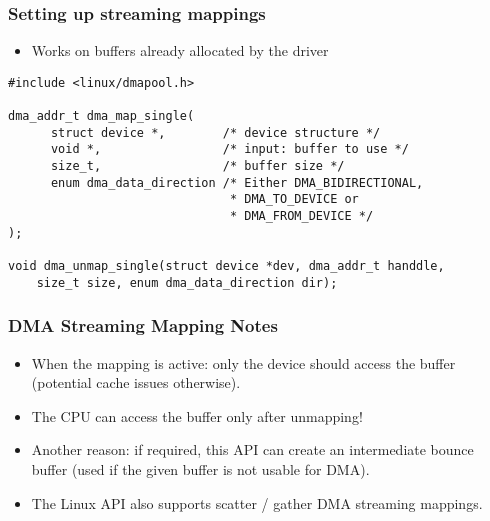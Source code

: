 \begin{frame}[fragile]
  \frametitle{Setting up streaming mappings}
  \begin{itemize}
  \item Works on buffers already allocated by the driver
  \end{itemize}
\begin{verbatim}
#include <linux/dmapool.h>

dma_addr_t dma_map_single(
      struct device *,        /* device structure */
      void *,                 /* input: buffer to use */
      size_t,                 /* buffer size */
      enum dma_data_direction /* Either DMA_BIDIRECTIONAL,
                               * DMA_TO_DEVICE or
                               * DMA_FROM_DEVICE */
);

void dma_unmap_single(struct device *dev, dma_addr_t handdle,
    size_t size, enum dma_data_direction dir);
\end{verbatim}
\end{frame}

\begin{frame}
  \frametitle{DMA Streaming Mapping Notes}
  \begin{itemize}
  \item When the mapping is active: only the device should access the
    buffer (potential cache issues otherwise).
  \item The CPU can access the buffer only after unmapping!
  \item Another reason: if required, this API can create an
    intermediate bounce buffer (used if the given buffer is not usable
    for DMA).
  \item The Linux API also supports scatter / gather DMA streaming
    mappings.
  \end{itemize}
\end{frame}
